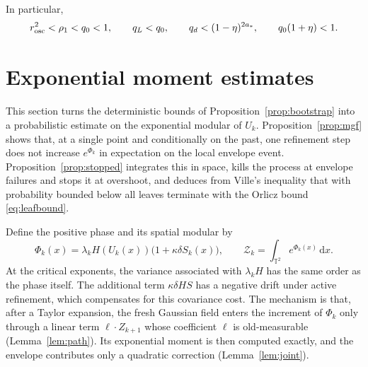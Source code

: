 \documentclass[11pt]{article}
\theoremstyle{definition}
\theoremstyle{remark}
\numberwithin{equation}{section}
\newcommand{\T}{\mathbb T}
\newcommand{\dd}{\,\mathrm d}
\begin{document}
\noindent In particular,
\begin{equation}\label{eq:strictschedule}
 r_{\rm osc}^2<\rho_1<q_0<1,\qquad q_L<q_0,\qquad
 q_d<(1-\eta)^{2a_*},\qquad q_0(1+\eta)<1.
\end{equation}

\section{Exponential moment estimates}\label{sec:phase}

This section turns the deterministic bounds of
Proposition~\ref{prop:bootstrap} into a probabilistic estimate on the
exponential modular of $U_k$. Proposition~\ref{prop:mgf} shows that,
at a single point and conditionally on the past, one refinement step
does not increase $e^{\Phi_k}$ in expectation on the local envelope
event. Proposition~\ref{prop:stopped} integrates this in space, kills
the process at envelope failures and stops it at overshoot, and
deduces from Ville's inequality that with probability bounded below
all leaves terminate with the Orlicz bound \eqref{eq:leafbound}.

Define the positive phase and its spatial modular by
\begin{equation}\label{eq:Phi}
 \Phi_k(x)=\lambda_kH(U_k(x))\bigl(1+\kappa\delta S_k(x)\bigr),
 \qquad \mathcal Z_k=\int_{\T^2}e^{\Phi_k(x)}\dd x.
\end{equation}
At the critical exponents, the variance associated with $\lambda_kH$
has the same order as the phase itself. The additional term
$\kappa\delta HS$ has a negative drift under active refinement,
which compensates for this covariance cost. The mechanism is that,
after a Taylor expansion, the fresh Gaussian field enters the
increment of $\Phi_k$ only through a linear term $\ell\cdot Z_{k+1}$
whose coefficient $\ell$ is old-measurable
(Lemma~\ref{lem:path}). Its exponential moment is then computed
exactly, and the envelope contributes only a quadratic correction
(Lemma~\ref{lem:joint}).
\end{document}
